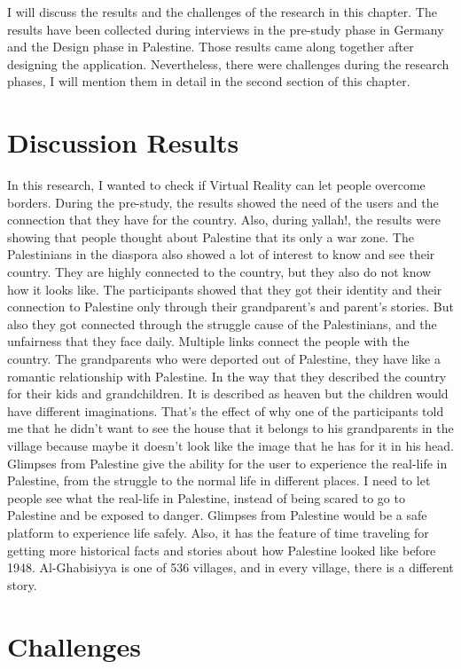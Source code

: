 I will discuss the results and the challenges of the research in this chapter. The results have been collected during interviews in the pre-study phase in Germany and the Design phase in Palestine. Those results came along together after designing the application. Nevertheless, there were challenges during the research phases, I will mention them in detail in the second section of this chapter. 

\section{Discussion Results}
In this research, I wanted to check if Virtual Reality can let people overcome borders. During the pre-study, the results showed the need of the users and the connection that they have for the country.  Also, during \acrshort{yallah!}, the results were showing that people thought about Palestine that its only a war zone. The Palestinians in the diaspora also showed a lot of interest to know and see their country. They are highly connected to the country, but they also do not know how it looks like. The participants showed that they got their identity and their connection to Palestine only through their grandparent's and parent's stories. But also they got connected through the struggle cause of the Palestinians, and the unfairness that they face daily. Multiple links connect the people with the country. The grandparents who were deported out of Palestine, they have like a romantic relationship with Palestine. In the way that they described the country for their kids and grandchildren. It is described as heaven but the children would have different imaginations. That's the effect of why one of the participants told me that he didn't want to see the house that it belongs to his grandparents in the village because maybe it doesn't look like the image that he has for it in his head. Glimpses from Palestine give the ability for the user to experience the real-life in Palestine, from the struggle to the normal life in different places. I need to let people see what the real-life in Palestine, instead of being scared to go to Palestine and be exposed to danger. Glimpses from Palestine would be a safe platform to experience life safely. Also, it has the feature of time traveling for getting more historical facts and stories about how Palestine looked like before 1948. Al-Ghabisiyya is one of 536 villages, and in every village, there is a different story.  



\section{Challenges}

